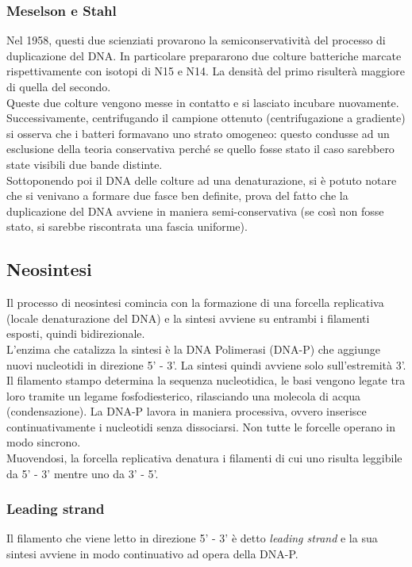         \subsubsection{Meselson e Stahl}
            Nel 1958, questi due scienziati provarono la semiconservatività del processo di duplicazione del DNA. In particolare prepararono due colture batteriche marcate rispettivamente con isotopi di N15 e N14. La densità del primo risulterà maggiore di quella del secondo.\\
            Queste due colture vengono messe in contatto e si lasciato incubare nuovamente. Successivamente, centrifugando il campione ottenuto (centrifugazione a gradiente) si osserva che i batteri formavano uno strato omogeneo: questo condusse ad un esclusione della teoria conservativa perché se quello fosse stato il caso sarebbero state visibili due bande distinte.\\
            Sottoponendo poi il DNA delle colture ad una denaturazione, si è potuto notare che si venivano a formare due fasce ben definite, prova del fatto che la duplicazione del DNA avviene in maniera semi-conservativa (se così non fosse stato, si sarebbe riscontrata una fascia uniforme).
        
        \subsection{Neosintesi}
            Il processo di neosintesi comincia con la formazione di una forcella replicativa (locale denaturazione del DNA) e la sintesi avviene su entrambi i filamenti esposti, quindi bidirezionale. \\
            L'enzima che catalizza la sintesi è la DNA Polimerasi (DNA-P) che aggiunge nuovi nucleotidi in direzione 5' - 3'. La sintesi quindi avviene solo sull'estremità 3'.\\
            Il filamento stampo determina la sequenza nucleotidica, le basi vengono legate tra loro tramite un legame fosfodiesterico, rilasciando una molecola di acqua (condensazione).
            La DNA-P lavora in maniera processiva, ovvero inserisce continuativamente i nucleotidi senza dissociarsi. Non tutte le forcelle operano in modo sincrono. \\
            Muovendosi, la forcella replicativa denatura i filamenti di cui uno risulta leggibile da 5' - 3' mentre uno da 3' - 5'. 
            \subsubsection{Leading strand}
                Il filamento che viene letto in direzione 5' - 3' è detto \textit{leading strand} e la sua sintesi avviene in modo continuativo ad opera della DNA-P.
            
